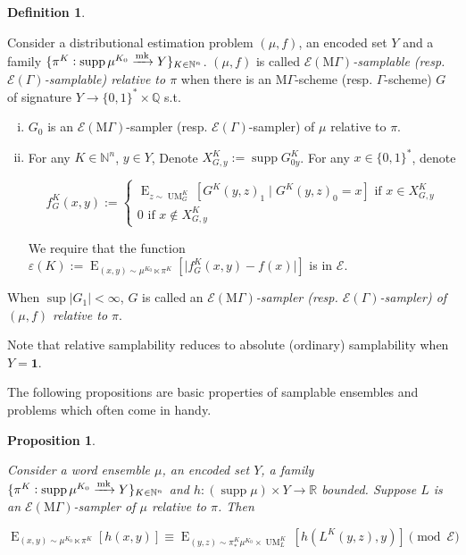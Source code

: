 \documentclass{article}
\numberwithin{equation}{section}
\theoremstyle{definition}
\newtheorem{definition}{Definition}[section]
\theoremstyle{plain}
\newtheorem{proposition}{Proposition}[section]
\newcommand{\Bool}{\{0,1\}}
\newcommand{\Words}{{\Bool^*}}
\DeclareMathOperator{\Supp}{supp}
\DeclareMathOperator{\E}{E}
\DeclareMathOperator{\UM}{UM}
\newcommand{\Nats}{\mathbb{N}}
\newcommand{\Rats}{\mathbb{Q}}
\newcommand{\Reals}{\mathbb{R}}
\newcommand{\Abs}[1]{\lvert #1 \rvert}
\newcommand{\MGrow}{\mathrm{M}\Gamma}
\newcommand{\Fall}{\mathcal{E}}
\newcommand{\EG}{\Fall(\Gamma)}
\newcommand{\EMG}{\Fall(\MGrow)}
\newcommand{\Markov}{\xrightarrow{\textnormal{mk}}}
\begin{document}
\begin{samepage}
\begin{definition}
\label{def:gen_rel}

Consider a distributional estimation problem $(\mu,f)$, an encoded set $Y$ and a family $\{\pi^K: \Supp \mu^{K_0} \Markov Y\}_{K \in \Nats^n}$. $(\mu,f)$ is called \emph{$\EMG$-samplable (resp. $\EG$-samplable) relative to $\pi$} when there is an $\MGrow$-scheme (resp. $\Gamma$-scheme) $G$ of signature $Y \rightarrow \Words \times \Rats$ s.t.

\begin{enumerate}[(i)]

\item $G_0$ is an $\EMG$-sampler (resp. $\EG$-sampler) of $\mu$ relative to $\pi$.

\item For any $K \in \Nats^n$, $y \in Y$, Denote $X_{G,y}^K:=\Supp G_{0y}^K$. For any ${x \in \Words}$, denote 

$$f_G^K(x,y):=\begin{cases}\E_{z \sim\UM_G^K}[G^K(y,z)_1 \mid G^K(y,z)_0 = x] \text{ if } x \in X_{G,y}^K \\ 0 \text{ if } x \not\in X_{G,y}^K \end{cases}$$

We require that the function ${\varepsilon(K):=\E_{(x,y) \sim \mu^{K_0} \ltimes \pi^K}[\Abs{f_G^K(x,y)-f(x)}]}$ is in $\Fall$.

\end{enumerate}

When $\sup{\Abs{G_1}} < \infty$, $G$ is called an \emph{$\EMG$-sampler (resp. $\EG$-sampler) of $(\mu,f)$ relative to $\pi$}.

\end{definition}
\end{samepage}

Note that relative samplability reduces to absolute (ordinary) samplability when $Y=\bm{1}$.

The following propositions are basic properties of samplable ensembles and problems which often come in handy.

\begin{samepage}
\begin{proposition}
\label{prp:smp}

Consider a word ensemble $\mu$, an encoded set $Y$, a family ${\{\pi^K: \Supp \mu^{K_0} \Markov Y\}_{K \in \Nats^n}}$ and ${h: (\Supp \mu) \times Y \rightarrow \Reals}$ bounded. Suppose $L$ is an $\EMG$-sampler of $\mu$ relative to $\pi$. Then

\begin{equation}
\label{eqn:prp__smp}
\E_{(x,y) \sim \mu^{K_0} \ltimes \pi^K}[h(x,y)] \equiv \E_{(y,z) \sim \pi_*^K\mu^{K_0} \times \UM_L^K}[h(L^K(y,z),y)] \pmod \Fall
\end{equation}

\end{proposition}
\end{samepage}
\end{document}
